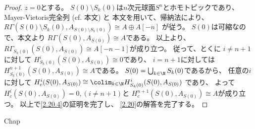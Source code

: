 \documentclass[uplatex,dvipdfmx]{jsarticle}
\begin{document}
\begin{proof}
  \(z=0\)とする。
  \(S(0)\setminus S_k(0)\)は\(n\)次元球面\(S^n\)とホモトピックであり、
  Mayer-Vietoris完全列
  (cf. 本文\cite[Remark 2.6.10]{kashiwara2002sheaves}) と
  本文\cite[Corollary 2.7.7 (iii)]{kashiwara2002sheaves}を用いて、帰納法により、
  \(R\Gamma(S(0)\setminus S_k(0),A_{S(0)\setminus S_k(0)})\cong A\oplus A[-n]\)
  が従う。
  \(S(0)\)は可縮なので、本文\cite[Corollary 2.7.7 (iii)]{kashiwara2002sheaves}より
  \(R\Gamma(S(0),A_{S(0)})\cong A\)である。
  以上より、\(R\Gamma_{S_k(0)}(S(0),A_{S(0)}) \cong A[-n-1]\)が成り立つ。
  従って、とくに
  \(i\neq n+1\)に対して
  \(H^i_{S_k(0)}(S(0),A_{S(0)})\cong 0\)であり、
  \(i=n+1\)に対しては\(H^{n+1}_{S_k(0)}(S(0),A_{S(0)})\cong A\)である。
  \(S(0)=\bigcup_{k\in \N}S_k(0)\)であるから、
  任意の\(i\)に対して
  \(H^i_c(S(0),A_{S(0)})\cong \colim_{k\in \N}H^i_{S_k(0)}(S(0),A_{S(0)})\)
  であり、
  よって\(H^i_c(S(0),A_{S(0)}) = 0, (i\neq n+1)\)と
  \(H^{n+1}_c(S(0),A_{S(0)}) \cong A\)が成り立つ。
  以上で\ref{2.20.4}の証明を完了し、
  \autoref{2.20}の解答を完了する。
\end{proof}






\ifcsname Chap\endcsname\else
\printbibliography
\end{document}
